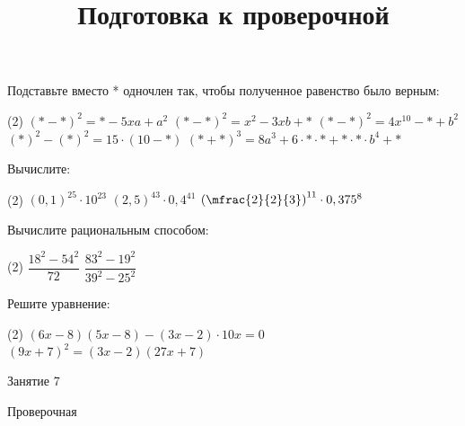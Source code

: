 \begin{homework}[number=3]
	\begin{listofex}
		\item Подставьте вместо * одночлен так, чтобы полученное равенство было верным:
		\begin{tasks}(2)
			\task \( (*-*)^2=*-5xa+a^2 \)
			\task \( (*-*)^2=x^2-3xb+* \)
			\task \( (*-*)^2=4x^{10}-*+b^2 \)
			\task \( (*)^2-(*)^2= 15 \cdot (10-*) \)
			\task \( (*+*)^3=8a^3+6 \cdot * \cdot * + * \cdot * \cdot b^4 + * \)
		\end{tasks}
		\item Вычислите:
		\begin{tasks}(2)
			\task \( (0,1)^{25} \cdot 10^{23} \)
			\task \( (2,5)^{43} \cdot 0,4^{41} \)
			\task \( \left( \mfrac{2}{2}{3} \right)^{11}  \cdot 0,375^8 \)
		\end{tasks}
		\item Вычислите рациональным способом:
		\begin{tasks}(2)
			\task \( \dfrac{18^2-54^2}{72} \)
			\task \( \dfrac{83^2-19^2}{39^2-25^2} \)
		\end{tasks}
		\item Решите уравнение:
		\begin{tasks}(2)
			\task \( (6x-8)(5x-8)-(3x-2)\cdot 10x=0 \)
			\task \( (9x+7)^2= (3x-2)(27x+7) \)
		\end{tasks}
	\end{listofex}
\end{homework}

\begin{class}[number=7]
	\title{Подготовка к проверочной}
	\begin{listofex}
		\item Занятие 7
	\end{listofex}
\end{class}

\begin{exam}
	\begin{listofex}
		\item Проверочная
	\end{listofex}
\end{exam}
